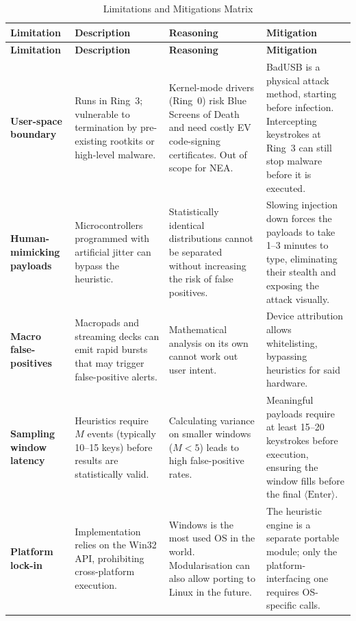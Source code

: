 	{\small
		\renewcommand{\arraystretch}{1.2}
		\begin{xltabular}{\textwidth}{@{} P{2.6cm} L L L @{}}
			\caption{Limitations and Mitigations Matrix} \label{tab:limitations_matrix} \\
			\toprule
			\textbf{Limitation} & \textbf{Description} & \textbf{Reasoning} & \textbf{Mitigation} \\
			\midrule
			\endfirsthead

			\toprule
			\textbf{Limitation} & \textbf{Description} & \textbf{Reasoning} & \textbf{Mitigation} \\
			\midrule
			\endhead


			\textbf{User-space boundary} &
			Runs in Ring~3; vulnerable to termination by pre-existing rootkits or high-level malware. &
			Kernel-mode drivers (Ring~0) risk Blue Screens of Death and need costly EV code-signing certificates. Out of scope for NEA. &
			BadUSB is a physical attack method, starting before infection. Intercepting keystrokes at Ring~3 can still stop malware before it is executed. \\

			\textbf{Human-mimicking payloads} &
			Microcontrollers programmed with artificial jitter can bypass the heuristic. &
			Statistically identical distributions cannot be separated without increasing the risk of false positives. &
			Slowing injection down forces the payloads to take 1--3 minutes to type, eliminating their stealth and exposing the attack visually. \\

			\textbf{Macro false-positives} &
			Macropads and streaming decks can emit rapid bursts that may trigger false-positive alerts. &
			Mathematical analysis on its own cannot work out user intent. &
			Device attribution allows whitelisting, bypassing heuristics for said hardware. \\

			\textbf{Sampling window latency} &
			Heuristics require $M$ events (typically 10--15 keys) before results are statistically valid. &
			Calculating variance on smaller windows ($M < 5$) leads to high false-positive rates. &
			Meaningful payloads require at least 15--20 keystrokes before execution, ensuring the window fills before the final $\langle\text{Enter}\rangle$. \\

			\textbf{Platform lock-in} &
			Implementation relies on the Win32 API, prohibiting cross-platform execution. &
			Windows is the most used OS in the world. Modularisation can also allow porting to Linux in the future. &
			The heuristic engine is a separate portable module; only the platform-interfacing one requires OS-specific calls. \\
		\end{xltabular}
	}
